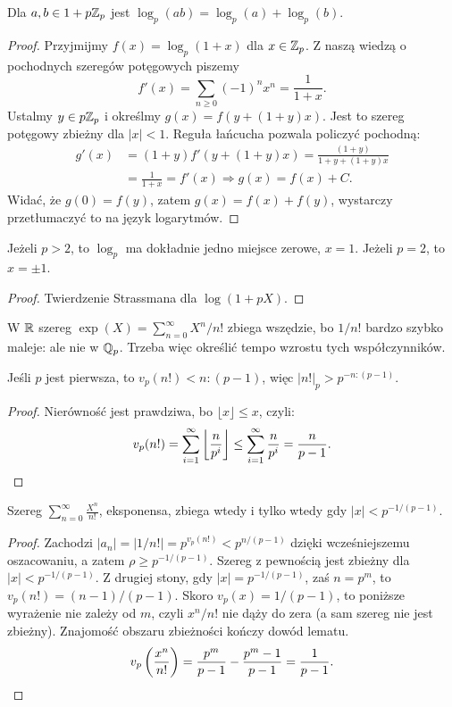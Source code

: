 \begin{fakt}
	Dla $a, b \in 1+p\mathbb{Z}_p$ jest $\log_p(ab) = \log_p(a) + \log_p(b)$.
\end{fakt}

\begin{proof}
	Przyjmijmy $f(x) = \log_p(1+x)$ dla $x \in \mathbb{Z}_p$.
	Z naszą wiedzą o pochodnych szeregów potęgowych piszemy
	\[
		f'(x) = \sum_{n \ge 0} (-1)^nx^n = \frac{1}{1+x}.
	\]
	Ustalmy $y \in p\mathbb{Z}_p$ i określmy $g(x) = f(y + (1+y)x)$.
	Jest to szereg potęgowy zbieżny dla $|x| < 1$.
	Reguła łańcucha pozwala policzyć pochodną:
	\begin{align*}
		g'(x) & = (1+y) f'(y + (1+y)x)= \frac{(1+y)}{1+y + (1+y)x} \\
		& = \frac{1}{1+x} = f'(x) \Rightarrow g(x) = f(x) + C.
	\end{align*}
	Widać, że $g(0) = f(y)$, zatem $g(x) = f(x) + f(y)$, wystarczy przetłumaczyć to na język logarytmów.
\end{proof}

\begin{fakt}
	Jeżeli $p > 2$, to $\log_p$ ma dokładnie jedno miejsce zerowe, $x = 1$.
	Jeżeli $p = 2$, to $x = \pm 1$.
\end{fakt}

\begin{proof}
	Twierdzenie Strassmana dla $\log(1+pX)$.
\end{proof}

W $\mathbb{R}$ szereg $\exp(X) = \sum_{n=0}^\infty X^n/n!$ zbiega wszędzie, bo $1/n!$ bardzo szybko maleje: ale nie w $\mathbb{Q}_p$.
Trzeba więc określić tempo wzrostu tych współczynników.

\begin{lemat}
	Jeśli $p$ jest pierwsza, to $v_p(n!) < n : (p-1)$, więc $|n!|_p > p^{-n:(p-1)}$.
\end{lemat}

\begin{proof}
	Nierówność jest prawdziwa, bo $\lfloor x \rfloor \le x$, czyli:
	\[
		v_p(n!) = \sum_{i=1}^\infty \left \lfloor \frac n {p^i} \right \rfloor \le \sum_{i=1}^\infty \frac n {p^i} = \frac n {p-1}. \qedhere
	\]
\end{proof}

\begin{lemat}
	Szereg $\sum_{n=0}^\infty \frac{{X^n}}{n!}$, eksponensa, zbiega wtedy i tylko wtedy gdy $|x| < p^{-1/(p-1)}$. 
\end{lemat}

\begin{proof}
	Zachodzi $|a_n| = |1/n!| = p^{v_p(n!)} < p^{n/(p-1)}$ dzięki wcześniejszemu oszacowaniu, a zatem $\rho \ge p^{-1/(p-1)}$.
	Szereg z pewnością jest zbieżny dla $|x| < p^{-1/(p-1)}$.
	Z drugiej stony, gdy $|x| = p^{-1/(p-1)}$, zaś $n = p^m$, to $v_p(n!) = (n-1)/(p-1)$.
	Skoro $v_p(x) = 1/(p-1)$, to poniższe wyrażenie nie zależy od $m$, czyli $x^n/n!$ nie dąży do zera (a sam szereg nie jest zbieżny).
	Znajomość obszaru zbieżności kończy dowód lematu.
	\[
		v_p\left ( \frac{x^n}{n!}\right) = \frac{p^m}{p-1} - \frac{p^m-1}{p-1} = \frac{1}{p-1}. \qedhere
	\]
\end{proof}

